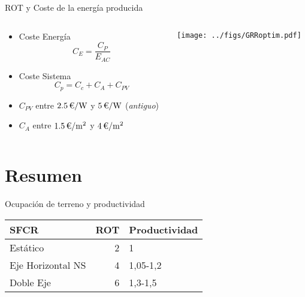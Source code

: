 \documentclass[aspectratio=169, usenames,svgnames,dvipsnames]{beamer}
\begin{document}
\begin{frame}[label={sec:org86521a7}]{ROT y Coste de la energía producida}
\begin{columns}
\begin{column}{0.3\columnwidth}
\begin{itemize}
\item Coste Energía
$$C_E = \frac{C_P}{E_{AC}}$$
\item Coste Sistema
$$C_p = C_c + C_A + C_{PV}$$

\item \(C_{PV}\) entre \(\SI{2.5}{\text{\texteuro}\per\watt}\) y \(\SI{5}{\text{\texteuro}\per\watt}\) (\emph{antiguo})

\item \(C_A\) entre \(\SI{1.5}{\text{\texteuro}\per\meter\squared}\) y \(\SI{4}{\text{\texteuro}\per\meter\squared}\)
\end{itemize}
\end{column}

\begin{column}{0.8\columnwidth}
\begin{center}
\texttt{[image: ../figs/GRRoptim.pdf]}
\end{center}
\end{column}
\end{columns}
\end{frame}

\section{Resumen}
\label{sec:org0a47e21}

\begin{frame}[label={sec:org09a21b7}]{Ocupación de terreno y productividad}
\begin{center}
\begin{tabular}{lrl}
SFCR & ROT & Productividad\\[0pt]
\hline
Estático & 2 & 1\\[0pt]
Eje Horizontal NS & 4 & 1,05-1,2\\[0pt]
Doble Eje & 6 & 1,3-1,5\\[0pt]
\end{tabular}
\end{center}
\end{frame}
\end{document}
